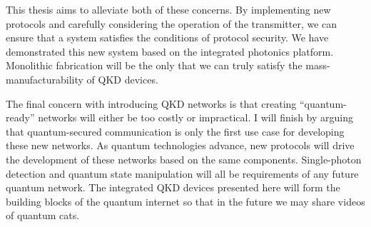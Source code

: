 This thesis aims to alleviate both of these concerns. By implementing new protocols and carefully considering the operation of the transmitter, we can ensure that a system satisfies the conditions of protocol security. We have demonstrated this new system based on the integrated photonics platform. Monolithic fabrication will be the only that we can truly satisfy the mass-manufacturability of \ac{QKD} devices. 

The final concern with introducing \ac{QKD} networks is that creating ``quantum-ready'' networks will either be too costly or impractical. I will finish by arguing that quantum-secured communication is only the first use case for developing these new networks. As quantum technologies advance, new protocols will drive the development of these networks based on the same components. Single-photon detection and quantum state manipulation will all be requirements of any future quantum network. The integrated \ac{QKD} devices presented here will form the building blocks of the quantum internet so that in the future we may share videos of quantum cats.






